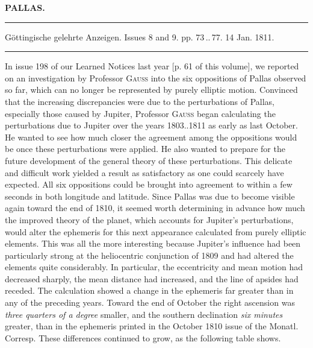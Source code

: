 \clearpage{}\hypertarget{native-327-lower}{}\label{native-327-lower}

\begin{center}\textbf{PALLAS.}\par\vspace{4pt}\hrule\vspace{4pt}\fontsize{10}{12}\selectfont Göttingische gelehrte Anzeigen. Issues 8 and 9. pp. 73\,..\,77. 14 Jan. 1811.\par\vspace{4pt}\hrule\vspace{4pt}\end{center}

\par\indent In issue 198 of our Learned Notices last year [p. 61 of this volume], we reported on an investigation by Professor \textsc{Gauss} into the six oppositions of Pallas observed so far, which can no longer be represented by purely elliptic motion. Convinced that the increasing discrepancies were due to the perturbations of Pallas, especially those caused by Jupiter, Professor \textsc{Gauss} began calculating the perturbations due to Jupiter over the years 1803..1811 as early as last October. He wanted to see how much closer the agreement among the oppositions would be once these perturbations were applied. He also wanted to prepare for the future development of the general theory of these perturbations. This delicate and difficult work yielded a result as satisfactory as one could scarcely have expected. All six oppositions could be brought into agreement to within a few seconds in both longitude and latitude. Since Pallas was due to become visible again toward the end of 1810, it seemed worth determining in advance how much the improved theory of the planet, which accounts for Jupiter’s perturbations, would alter the ephemeris for this next appearance calculated from purely elliptic elements. This was all the more interesting because Jupiter’s influence had been particularly strong at the heliocentric conjunction of 1809 and had altered the elements quite considerably. In particular, the eccentricity and mean motion had decreased sharply, the mean distance had increased, and the line of apsides had receded. The calculation showed a change in the ephemeris far greater than in any of the preceding years. Toward the end of October the right ascension was \emph{three quarters of a degree} smaller, and the southern declination \emph{six minutes} greater, than in the ephemeris printed in the October 1810 issue of the Monatl. Corresp. These differences continued to grow, as the following table shows.
